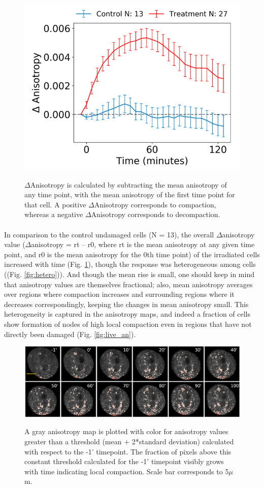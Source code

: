 \begin{figure}[H]
    {\hfill\includegraphics[clip, width=0.5\linewidth]{figures/timetrace.png}\hspace*{\fill}}
    \caption{$\Delta$Anisotropy is calculated by subtracting the mean anisotropy of any time point, with the mean anisotropy of the first time point for that cell. A positive $\Delta$Anisotropy corresponds to compaction, whereas a negative $\Delta$Anisotropy corresponds to decompaction.}
    {\label{fig:timetrace}}
\end{figure}

\paragraph*{}In comparison to the control undamaged cells (N = 13), the overall $\Delta$anisotropy value ($\Delta$anisotropy = rt – r0, where rt is the mean anisotropy at any given time point, and r0 is the mean anisotropy for the 0th time point) of the irradiated cells increased with time (Fig. {\ref{fig:timetrace}}), though the response was heterogeneous among cells ((Fig. {\ref{fig:hetero}})). And though the mean rise is small, one should keep in mind that anisotropy values are themselves fractional; also, mean anisotropy averages over regions where compaction increases and surrounding regions where it decreases correspondingly, keeping the changes in mean anisotropy small. This heterogeneity is captured in the anisotropy maps, and indeed a fraction of cells show formation of nodes of high local compaction even in regions that have not directly been damaged (Fig. {\ref{fig:live_an}}). 

\begin{figure}[htp]
    {\hfill\includegraphics[clip, width=1\linewidth]{figures/thresholded.png}\hspace*{\fill}}
    \caption{A gray anisotropy map is plotted with color for anisotropy values greater than a threshold (mean + 2*standard deviation) calculated with respect to the -1' timepoint. The fraction of pixels above this constant threshold calculated for the -1' timepoint visibly grows with time indicating local compaction. Scale bar corresponds to 5$\mu$m.}
    {\label{fig:thresholded}}
\end{figure}

